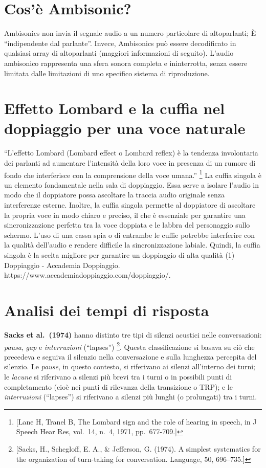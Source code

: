 \documentclass[
]{article}
\begin{document}
\section{Cos'è Ambisonic?}\label{cosuxe8-ambisonic}

Ambisonics non invia il segnale audio a un numero particolare di altoparlanti; È ``indipendente dal parlante''. Invece, Ambisonics può essere decodificato in qualsiasi array di altoparlanti (maggiori informazioni di seguito). L'audio ambisonico rappresenta una sfera sonora completa e ininterrotta, senza essere limitata dalle limitazioni di uno specifico sistema di riproduzione.

\section{Effetto Lombard e la cuffia nel doppiaggio per una voce naturale}\label{effetto-lombard-e-la-cuffia-nel-doppiaggio-per-una-voce-naturale}

``L'effetto Lombard (Lombard effect o Lombard reflex) è la tendenza involontaria dei parlanti ad aumentare l'intensità della loro voce in presenza di un rumore di fondo che interferisce con la comprensione della voce umana.'' \footnote{{[}Lane H, Tranel B, The Lombard sign and the role of hearing in speech, in J Speech Hear Res, vol.~14, n.~4, 1971, pp.~677-709.{]}} La cuffia singola è un elemento fondamentale nella sala di doppiaggio. Essa serve a isolare l'audio in modo che il doppiatore possa ascoltare la traccia audio originale senza interferenze esterne. Inoltre, la cuffia singola permette al doppiatore di ascoltare la propria voce in modo chiaro e preciso, il che è essenziale per garantire una sincronizzazione perfetta tra la voce doppiata e le labbra del personaggio sullo schermo. L'uso di una cassa spia o di entrambe le cuffie potrebbe interferire con la qualità dell'audio e rendere difficile la sincronizzazione labiale. Quindi, la cuffia singola è la scelta migliore per garantire un doppiaggio di alta qualità (1) Doppiaggio - Accademia Doppiaggio. https://www.accademiadoppiaggio.com/doppiaggio/.

\section{Analisi dei tempi di risposta}\label{analisi-dei-tempi-di-risposta}

\textbf{Sacks et al.~(1974)} hanno distinto tre tipi di silenzi acustici nelle conversazioni: \emph{pausa}, \emph{gap} e \emph{interruzioni} (``lapses'') \footnote{{[}Sacks, H., Schegloff, E. A., \& Jefferson, G. (1974). A simplest systematics for the organization of turn-taking for conversation. Language, 50, 696--735.{]}}. Questa classificazione si basava su ciò che precedeva e seguiva il silenzio nella conversazione e sulla lunghezza percepita del silenzio. Le \emph{pause}, in questo contesto, si riferivano ai silenzi all'interno dei turni; le \emph{lacune} si riferivano a silenzi più brevi tra i turni o in possibili punti di completamento (cioè nei punti di rilevanza della transizione o TRP); e le \emph{interruzioni} (``lapses'') si riferivano a silenzi più lunghi (o prolungati) tra i turni.
\end{document}
